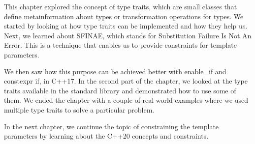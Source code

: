 This chapter explored the concept of type traits, which are small classes that define metainformation about types or transformation operations for types. We started by looking at how type traits can be implemented and how they help us. Next, we learned about SFINAE, which stands for Substitution Failure Is Not An Error. This is a technique that enables us to provide constraints for template parameters.

We then saw how this purpose can be achieved better with enable\_if and constexpr if, in C++17. In the second part of the chapter, we looked at the type traits available in the standard library and demonstrated how to use some of them. We ended the chapter with a couple of real-world examples where we used multiple type traits to solve a particular problem.

In the next chapter, we continue the topic of constraining the template parameters by learning about the C++20 concepts and constraints.